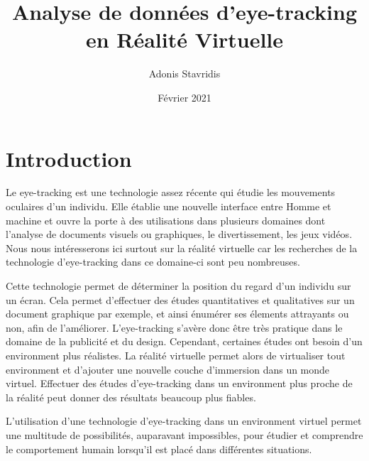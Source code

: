\documentclass{article}
\title{\textbf{Analyse de données d’eye-tracking en Réalité Virtuelle}}
\author{\Large{Adonis Stavridis}}
\date{Février 2021}
\begin{document}
  
  \maketitle
  \tableofcontents
  \pagebreak


  \section{Introduction}
  Le eye-tracking est une technologie assez récente qui étudie les mouvements
  oculaires d'un individu. Elle établie une nouvelle interface entre Homme et
  machine et ouvre la porte à des utilisations dans plusieurs domaines dont 
  l'analyse de documents visuels ou graphiques, le divertissement, les jeux
  vidéos. Nous nous intéresserons ici surtout sur la réalité virtuelle car les
  recherches de la technologie d'eye-tracking dans ce domaine-ci sont peu
  nombreuses.

  \bigskip
  Cette technologie permet de déterminer la position du regard d'un individu sur
  un écran. Cela permet d'effectuer des études quantitatives et qualitatives sur
  un document graphique par exemple, et ainsi énumérer ses élements attrayants 
  ou non, afin de l'améliorer. L'eye-tracking s'avère donc être très pratique 
  dans le domaine de la publicité et du design. Cependant, certaines études ont
  besoin d'un environment plus réalistes. La réalité virtuelle permet alors de
  virtualiser tout environment et d'ajouter une nouvelle couche d'immersion dans
  un monde virtuel. Effectuer des études d'eye-tracking dans un environment plus
  proche de la réalité peut donner des résultats beaucoup plus fiables.

  \bigskip
  L'utilisation d'une technologie d'eye-tracking dans un environment virtuel
  permet une multitude de possibilités, auparavant impossibles, pour étudier et 
  comprendre le comportement humain lorsqu'il est placé dans différentes
  situations.

\end{document}
